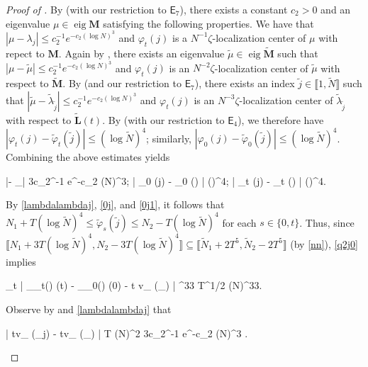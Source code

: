 \documentclass{amsart}
\numberwithin{equation}{section}
\DeclareMathOperator{\eig}{eig}
\DeclareMathOperator{\eff}{eff}
\theoremstyle{remark}
\theoremstyle{definition}
\begin{document}
\begin{proof}[Proof of ]
		\noindent By  (with our restriction to $\mathsf{E}_7$), there exists a constant $c_2>0$ and an eigenvalue $\mu \in \eig \bm{M}$ satisfying the following properties. We have that $|\mu - \lambda_j| \le c_2^{-1} e^{-c_2 (\log N)^3}$ and $\varphi_t (j)$ is a $N^{-1} \zeta$-localization center of $\mu$ with repect to $\bm{M}$. Again by , there exists an eigenvalue $\tilde{\mu} \in \eig \tilde{\bm{M}}$ such that $|\mu - \tilde{\mu}| \le c_2^{-1} e^{-c_2 (\log N)^3}$ and $\varphi_t (j)$ is an $N^{-2} \zeta$-localization center of $\tilde{\mu}$ with respect to $\tilde{\bm{M}}$. By  (and our restriction to $\mathsf{E}_7$), there exists an index $\tilde{j} \in \llbracket 1, \tilde{N} \rrbracket$ such that $|\tilde{\mu} - \tilde{\lambda}_{\tilde{j}}| \le c_2^{-1} e^{-c_2 (\log N)^3}$ and $\varphi_t (j)$ is an $N^{-3} \zeta$-localization center of $\tilde{\lambda}_{\tilde{j}}$ with respect to $\tilde{\bm{L}}(t)$. By  (with our restriction to $\mathsf{E}_4$), we therefore have $|\varphi_t (j) - \tilde{\varphi}_t (\tilde{j})| \le (\log \tilde{N})^4$; similarly, $|\varphi_0 (j) - \tilde{\varphi}_0 (\tilde{j})| \le (\log \tilde{N})^4$. Combining the above estimates yields
		\begin{flalign}
			\label{lambdalambdaj} 
			|\lambda - \tilde{\lambda}_{}| \le 3c_2^{-1} e^{-c_2 (\log N)^3}; \quad | \varphi_0 (j) - \tilde{\varphi}_0 () | \le (\log {})^4; \quad | \varphi_t (j) - \tilde{\varphi}_t () | \le (\log {})^4.
		\end{flalign} 
		
		 By \eqref{lambdalambdaj}, \eqref{0j}, and \eqref{0j1}, it follows that $N_1 + T(\log \tilde{N})^4 \le \tilde{\varphi}_s (\tilde{j}) \le N_2 - T(\log \tilde{N})^4$ for each $s \in \{ 0, t \}$. Thus, since $\llbracket N_1 + 3T (\log \tilde{N})^4, N_2 -3T(\log \tilde{N})^4 \rrbracket \subseteq \llbracket \tilde{N}_1 + 2T^5, \tilde{N}_2 - 2T^5 \rrbracket$ (by \eqref{nn}), \eqref{q2j0} implies
		\begin{flalign}
			\label{q1} 
			\displaystyle\sup_{t \in [0,T]} \big| _{\tilde{\varphi}_t()} (t) - _{\tilde{\varphi}_0()} (0) - t v_{\eff} (\tilde{\lambda}_{}) \big| ^{33} \cdot T^{1/2} (\log N)^{33}.
		\end{flalign}
		
		\noindent Observe by  and \eqref{lambdalambdaj} that 
		\begin{flalign}
		\label{q22} 
			| tv_{\eff} (\lambda_j) - tv_{\eff} (\tilde{\lambda}_{}) | \le T \cdot (\log N)^2 \cdot 3c_2^{-1} e^{-c_2 (\log N)^3} \le 1.
		\end{flalign} 
		

\end{proof}
\end{document}
